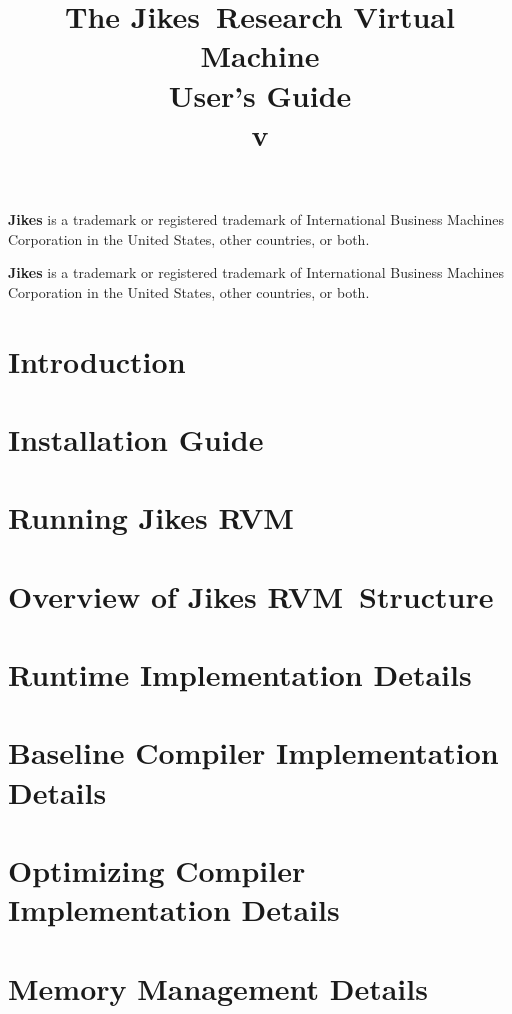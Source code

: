 \documentclass{article}
\title{\texonly{\vfill} {\huge The Jikes\JikesTMFootnote\ Research Virtual
Machine
\\
User's Guide} \\ {\huge v\version} \\ { } \texonly{\vfill} }
\newcommand{\JikesTMFooter}{\W \hline \small {\bf Jikes} is a
trademark or registered trademark of International Business Machines
Corporation in the United States, other countries, or both.}
\newcommand{\jrvm}{Jikes RVM}
\begin{document}
\maketitle
\date{}

\T \JikesTMFooter

\T \newpage
\label{hlxtoc}
\T \tableofcontents
\T \listoffigures
\W {}

\W \JikesTMFooter

\T \newpage
\section{Introduction}


\T \newpage
\section{Installation Guide} \label{section:installation}


\T \newpage
\section{Running \jrvm} \label{section:running}


\T \newpage
\section{Overview of \jrvm\ Structure}


\T \newpage
\section{Runtime Implementation Details}


\T \newpage
\section{Baseline Compiler Implementation Details}
\label{section:basedetails}


\T \newpage
\section{Optimizing Compiler Implementation Details}
\label{section:optdetails}


\T \newpage
\section{Memory Management Details}

\end{document}
